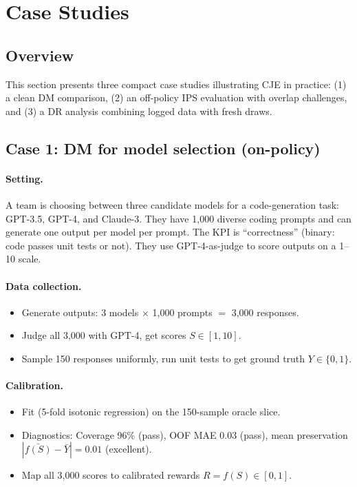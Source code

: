 \section{Case Studies}

\subsection{Overview}

This section presents three compact case studies illustrating CJE in practice: (1) a clean DM comparison, (2) an off-policy IPS evaluation with overlap challenges, and (3) a DR analysis combining logged data with fresh draws.

\subsection{Case 1: DM for model selection (on-policy)}

\paragraph{Setting.} A team is choosing between three candidate models for a code-generation task: GPT-3.5, GPT-4, and Claude-3. They have 1,000 diverse coding prompts and can generate one output per model per prompt. The KPI is ``correctness'' (binary: code passes unit tests or not). They use GPT-4-as-judge to score outputs on a 1--10 scale.

\paragraph{Data collection.}
\begin{itemize}
\item Generate outputs: 3 models $\times$ 1,000 prompts $=$ 3,000 responses.
\item Judge all 3,000 with GPT-4, get scores $S \in [1, 10]$.
\item Sample 150 responses uniformly, run unit tests to get ground truth $Y \in \{0, 1\}$.
\end{itemize}

\paragraph{Calibration.}
\begin{itemize}
\item Fit \autocal{} (5-fold isotonic regression) on the 150-sample oracle slice.
\item Diagnostics: Coverage 96\% (pass), OOF MAE 0.03 (pass), mean preservation $|\bar{f(S)} - \bar{Y}| = 0.01$ (excellent).
\item Map all 3,000 scores to calibrated rewards $R = f(S) \in [0, 1]$.
\end{itemize}

